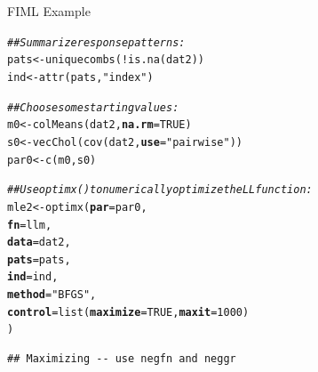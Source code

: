 \documentclass{beamer}\usepackage[]{graphicx}\usepackage[]{color}
\makeatletter
\newcommand{\hlnum}[1]{\textcolor[rgb]{0.69,0.494,0}{#1}}%
\newcommand{\hlstr}[1]{\textcolor[rgb]{0.749,0.012,0.012}{#1}}%
\newcommand{\hlcom}[1]{\textcolor[rgb]{0.514,0.506,0.514}{\textit{#1}}}%
\newcommand{\hlopt}[1]{\textcolor[rgb]{0,0,0}{#1}}%
\newcommand{\hlstd}[1]{\textcolor[rgb]{0,0,0}{#1}}%
\newcommand{\hlkwb}[1]{\textcolor[rgb]{0,0.341,0.682}{#1}}%
\newcommand{\hlkwc}[1]{\textcolor[rgb]{0,0,0}{\textbf{#1}}}%
\newcommand{\hlkwd}[1]{\textcolor[rgb]{0.004,0.004,0.506}{#1}}%
\newenvironment{kframe}{%
 \def\at@end@of@kframe{}%
 \ifinner\ifhmode%
  \def\at@end@of@kframe{\end{minipage}}%
  \begin{minipage}{\columnwidth}%
 \fi\fi%
 \def\FrameCommand##1{\hskip\@totalleftmargin \hskip-\fboxsep
 \colorbox{shadecolor}{##1}\hskip-\fboxsep
     \hskip-\linewidth \hskip-\@totalleftmargin \hskip\columnwidth}%
 \MakeFramed {\advance\hsize-\width
   \@totalleftmargin\z@ \linewidth\hsize
   \@setminipage}}%
 {\par\unskip\endMakeFramed%
 \at@end@of@kframe}
\newenvironment{knitrout}{}{} %
\makeatother
\begin{document}
\begin{frame}[fragile]{FIML Example}

\begin{knitrout}\scriptsize
{}\color{fgcolor}\begin{kframe}
\begin{alltt}
\hlcom{## Summarize response patterns:}
\hlstd{pats} \hlkwb{<-} \hlkwd{uniquecombs}\hlstd{(}\hlopt{!}\hlkwd{is.na}\hlstd{(dat2))}
\hlstd{ind}  \hlkwb{<-} \hlkwd{attr}\hlstd{(pats,} \hlstr{"index"}\hlstd{)}

\hlcom{## Choose some starting values:}
\hlstd{m0}   \hlkwb{<-} \hlkwd{colMeans}\hlstd{(dat2,} \hlkwc{na.rm} \hlstd{=} \hlnum{TRUE}\hlstd{)}
\hlstd{s0}   \hlkwb{<-} \hlkwd{vecChol}\hlstd{(}\hlkwd{cov}\hlstd{(dat2,} \hlkwc{use} \hlstd{=} \hlstr{"pairwise"}\hlstd{))}
\hlstd{par0} \hlkwb{<-} \hlkwd{c}\hlstd{(m0, s0)}

\hlcom{## Use optimx() to numerically optimize the LL function:}
\hlstd{mle2} \hlkwb{<-} \hlkwd{optimx}\hlstd{(}\hlkwc{par}     \hlstd{= par0,}
               \hlkwc{fn}      \hlstd{= llm,}
               \hlkwc{data}    \hlstd{= dat2,}
               \hlkwc{pats}    \hlstd{= pats,}
               \hlkwc{ind}     \hlstd{= ind,}
               \hlkwc{method}  \hlstd{=} \hlstr{"BFGS"}\hlstd{,}
               \hlkwc{control} \hlstd{=} \hlkwd{list}\hlstd{(}\hlkwc{maximize} \hlstd{=} \hlnum{TRUE}\hlstd{,} \hlkwc{maxit} \hlstd{=} \hlnum{1000}\hlstd{)}
               \hlstd{)}
\end{alltt}
\begin{verbatim}
## Maximizing -- use negfn and neggr
\end{verbatim}
\end{kframe}
\end{knitrout}

\end{frame}

\end{document}
